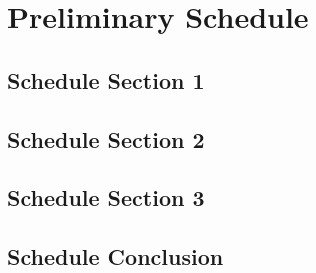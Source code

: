 %
\chapter{Preliminary Schedule}
\label{sec:schedule}


\Blindtext[2][1]

\section{Schedule Section 1}
\label{sec:schedule:sec1}

\Blindtext[2][2]

\section{Schedule Section 2}
\label{sec:schedule:sec2}

\Blindtext[3][2]

\section{Schedule Section 3}
\label{sec:schedule:sec3}

\Blindtext[4][2]

\section{Schedule Conclusion}
\label{sec:schedule:conclusion}

\Blindtext[2][1]
